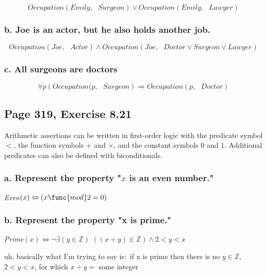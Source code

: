 \documentclass{article}
\begin{document}
\[
Occupation(Emily,\text{ }Surgeon)\vee Occupation(Emily,\text{ }Lawyer) 
\]

\subsubsection{b. Joe is an actor, but he also holds another job.}

\[
Occupation(Joe,\text{ }Actor)\wedge Occupation(Joe,\text{ }Doctor\vee
Surgeon\vee Lawyer) 
\]

\subsubsection{c. All surgeons are doctors}

\[
\forall p\left( Occupation(p,\text{ }Surgeon\right) \Rightarrow Occupation(p,%
\text{ }Doctor) 
\]

\subsection{Page 319, Exercise 8.21}

Arithmetic assertions can be written in first-order logic with the predicate
symbol $<$, the function symbols $+$ and $\times $, and the constant symbols 
$0$ and $1$. Additional predicates can also be defined with biconditionals.

\subsubsection{a. Represent the property "$x$ is an even number."}

\textit{Even}$\left( x\right) \Leftrightarrow \left( x\func{mod}2=0\right) $

\subsubsection{b. Represent the property "x is prime."}

\textit{Prime}$\left( x\right) \Leftrightarrow \lnot \exists \left( y\in 
\mathbb{Z}
\right) $ $\left( \left( x\div y\right) \in 
\mathbb{Z}
\right) \wedge 2<y<x$

uh, basically what I'm trying to say is:\ if x is prime then there is no $%
y\in 
\mathbb{Z}
$, $2<y<x$, for which $x\div y=$ some integer
\end{document}
